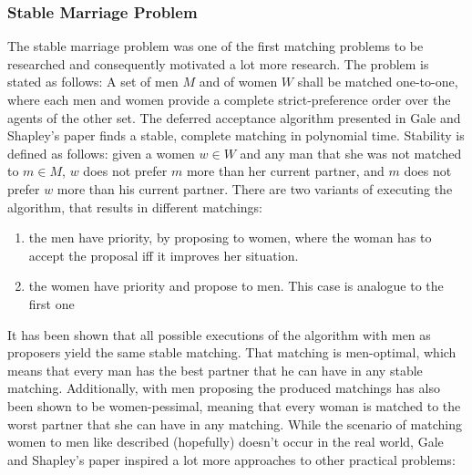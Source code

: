 \subsubsection{Stable Marriage Problem}
The stable marriage problem was one of the first matching problems to be researched\cite{GaleShapleyOrig} and consequently motivated a lot more research.
\newline
The problem is stated as follows: A set of men $M$ and of women $W$ shall be matched one-to-one, where each men and women provide a complete strict-preference order over the agents of the other set. The deferred acceptance algorithm presented in Gale and Shapley's paper\cite{GaleShapleyOrig} finds a stable, complete matching in polynomial time. Stability is defined as follows: given a women $w \in W$ and any man that she was not matched to $m \in M$, $w$ does not prefer $m$ more than her current partner, and $m$ does not prefer $w$ more than his current partner. There are two variants of executing the algorithm, that results in different matchings: 
\begin{enumerate}
    \item the men have priority, by proposing to women, where the woman has to accept the proposal iff it improves her situation.  
    \item the women have priority and propose to men. This case is analogue to the first one
\end{enumerate}
It has been shown that all possible executions of the algorithm with men as proposers yield the same stable matching. That matching is men-optimal, which means that every man has the best partner that he can have in any stable matching.\cite{Gusfield} Additionally, with men proposing the produced matchings has also been shown to be women-pessimal, meaning that every woman is matched to the worst partner that she can have in any matching.\cite{Gusfield}
\newline
While the scenario of matching women to men like described (hopefully) doesn't occur in the real world, Gale and Shapley's paper inspired a lot more approaches to other practical problems:

